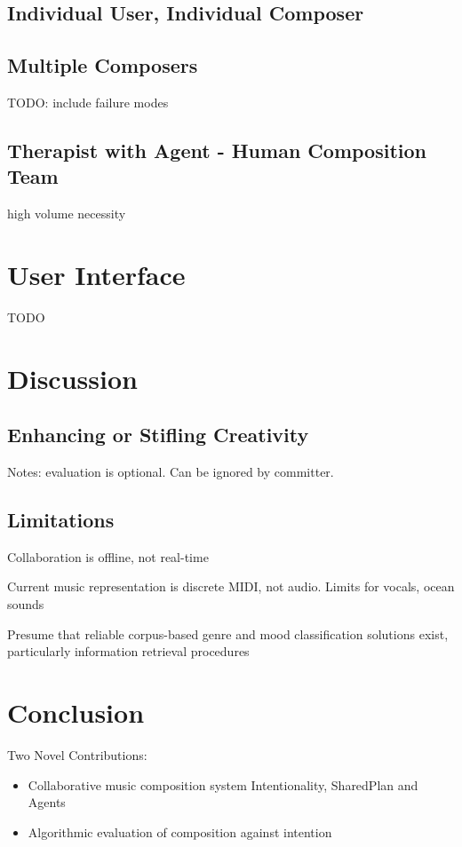 \documentclass[final,authoryear,11pt,times]{elsarticle}
\begin{document}
\subsection{Individual User, Individual Composer}

\subsection{Multiple Composers}

TODO: include failure modes

\subsection{Therapist with Agent - Human Composition Team}

high volume necessity

\section{User Interface}

TODO

\section{Discussion}

\subsection{Enhancing or Stifling Creativity}

Notes: evaluation is optional. Can be ignored by committer.

\subsection{Limitations}

Collaboration is offline, not real-time

Current music representation is discrete MIDI, not audio. Limits for vocals, ocean sounds

Presume that reliable corpus-based genre and mood classification solutions exist, particularly information retrieval procedures



\section{Conclusion}
 Two Novel Contributions:
 \begin{itemize}
\item Collaborative music composition system 
Intentionality, SharedPlan and Agents
\item Algorithmic evaluation of composition against intention
\end{itemize}
\end{document}
